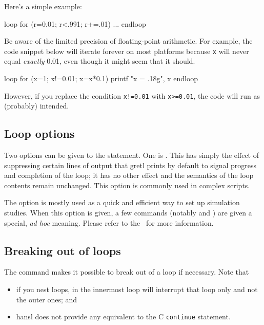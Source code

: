 Here's a simple example:
%
\begin{code}
loop for (r=0.01; r<.991; r+=.01)
   ...
endloop
\end{code}

Be aware of the limited precision of floating-point arithmetic. For
example, the code snippet below will iterate forever on most platforms
because \texttt{x} will never equal \textit{exactly} 0.01, even though
it might seem that it should.
\begin{code}
loop for (x=1; x!=0.01; x=x*0.1)
    printf "x = .18g\n", x
endloop  
\end{code}
However, if you replace the condition \texttt{x!=0.01} with
\texttt{x>=0.01}, the code will run as (probably) intended.
 
\vspace{1ex}

\subsection{Loop options}

Two options can be given to the  statement. One is
. This has simply the effect of suppressing certain
lines of output that gretl prints by default to signal progress and
completion of the loop; it has no other effect and the semantics of
the loop contents remain unchanged. This option is commonly used in
complex scripts.

The  option is mostly used as a quick and
efficient way to set up simulation studies. When this option is given,
a few commands (notably  and ) are given a
special, \emph{ad hoc} meaning. Please refer to the \GUG\ for more
information.
 
\subsection{Breaking out of loops}
\label{sec:loop-break}

The  command makes it possible to break out of a loop if
necessary. Note that
\begin{itemize}
\item if you nest loops,  in the innermost loop will
  interrupt that loop only and not the outer ones; and
\item hansl does not provide any equivalent to the C \texttt{continue}
  statement.
\end{itemize}


